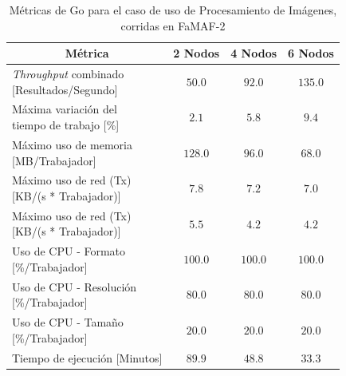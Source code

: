 \documentclass[11pt]{article}
\providecommand{\row}[1]{\parbox{150pt}{\setlength{\baselineskip}{0.2\baselineskip}\strut#1\strut}}
\newcommand{\ipcap}[2]{\caption{Métricas de #1 para el caso de uso de Procesamiento de Imágenes, corridas en #2}}
\newcommand{\english}[1]{\textit{#1}}
\begin{document}
\begin{table}[H]
\centering
\begin{tabular}{|l|c|c|c|}
\hline
\multicolumn{1}{|c|}{Métrica} & 2 Nodos & 4 Nodos & 6 Nodos \\ \hline
\row{\english{Throughput} combinado\\{[Resultados/Segundo]}} & $50.0$ & $92.0$ & $135.0$ \\ \hline
\row{Máxima variación del \\ tiempo de trabajo {[}\%{]}} & $2.1$ & $5.8$ & $9.4$ \\ \hline
\row{Máximo uso de memoria \\ {[MB/Trabajador]}} & $128.0$ & $96.0$ & $68.0$ \\ \hline
\row{Máximo uso de red (Tx) \\ {[KB/(s * Trabajador)]}} & $7.8$ & $7.2$ & $7.0$ \\ \hline
\row{Máximo uso de red (Tx) \\ {[KB/(s * Trabajador)]}} & $5.5$ & $4.2$ & $4.2$ \\ \hline
\row{Uso de CPU - Formato\\{[\%/Trabajador]}} & $100.0$ & $100.0$ & $100.0$ \\ \hline
\row{Uso de CPU - Resolución\\{[\%/Trabajador]}} & $80.0$ & $80.0$ & $80.0$ \\ \hline
\row{Uso de CPU - Tamaño\\{[\%/Trabajador]}} & $20.0$ & $20.0$ & $20.0$ \\ \hline
Tiempo de ejecución [Minutos] & $89.9$ & $48.8$ & $33.3$ \\ \hline
\end{tabular}
\ipcap{Go}{FaMAF-2}
\end{table}
\end{document}
